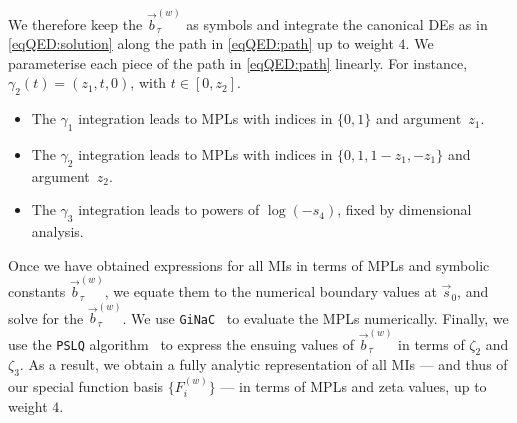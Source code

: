 \documentclass[main.tex]{subfiles}
\begin{document}
We therefore keep the $\vec{b}^{(w)}_{\tau}$ as symbols and integrate the canonical DEs as in \cref{eqQED:solution} along the path in \cref{eqQED:path} up to weight $4$. 
We parameterise each piece of the path in \cref{eqQED:path} linearly. For instance, 
$\gamma_2(t) = ( z_1,  t  , 0 )$,
with $t \in [0,z_2]$.
\begin{itemize}
\item The $\gamma_1$ integration leads to MPLs with indices in $\{0,1\}$ and argument~$z_1$.
\item The $\gamma_2$ integration leads to MPLs with indices in $\{0,1, 1-z_1, -z_1\}$ and argument~$z_2$.
\item The $\gamma_3$ integration leads to powers of $\log(-s_4)$, fixed by dimensional analysis.
\end{itemize}
Once we have obtained expressions for all MIs in terms of MPLs and symbolic constants $\vec{b}^{(w)}_{\tau}$, we equate them to the numerical boundary values at $\vec{s}_0$, and solve for the $\vec{b}^{(w)}_{\tau}$. We use \texttt{GiNaC}~\cite{Bauer:2000cp,Vollinga:2004sn} to evaluate the MPLs numerically.
Finally, we use the \texttt{PSLQ} algorithm~\cite{PSLQ} to express the ensuing values of $\vec{b}^{(w)}_{\tau}$ in terms of $\zeta_2$ and $\zeta_3$. As a result, we obtain a fully analytic representation of all MIs --- and thus of our special function basis $\{F^{(w)}_i\}$ --- in terms of MPLs and zeta values, up to weight $4$.
\end{document}
